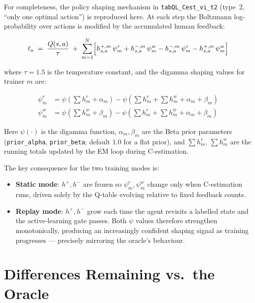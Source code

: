 \documentclass[11pt, a4paper]{article}
\begin{document}
For completeness, the policy shaping mechanism in \texttt{tabQL\_Cest\_vi\_t2}
(type~2, ``only one optimal action'') is reproduced here.  At each step the
Boltzmann log-probability over actions is modified by the accumulated human
feedback:

\begin{equation}
  \ell_a \;=\; \frac{Q(s,a)}{\tau}
  \;+\; \sum_{m=1}^{N}
    \Bigl[
      h^{+,m}_{s,a}\,\psi^r_m
      + h^{-,m}_{s,a}\,\psi^w_m
      - h^{-,m}_{s,a}\,\psi^r_m
      - h^{+,m}_{s,a}\,\psi^w_m
    \Bigr]
\end{equation}

where $\tau = 1.5$ is the temperature constant, and the digamma shaping
values for trainer $m$ are:

\begin{align}
  \psi^r_m &= \psi\!\left(\textstyle\sum h^r_m + \alpha_m\right)
             - \psi\!\left(\textstyle\sum h^r_m + \sum h^w_m + \alpha_m + \beta_m\right)
  \\[4pt]
  \psi^w_m &= \psi\!\left(\textstyle\sum h^w_m + \beta_m\right)
             - \psi\!\left(\textstyle\sum h^r_m + \sum h^w_m + \alpha_m + \beta_m\right)
\end{align}

Here $\psi(\cdot)$ is the digamma function, $\alpha_m, \beta_m$ are the Beta
prior parameters (\texttt{prior\_alpha}, \texttt{prior\_beta}; default $1.0$
for a flat prior), and $\sum h^r_m,\,\sum h^w_m$ are the running totals
updated by the EM loop during C-estimation.

The key consequence for the two training modes is:
\begin{itemize}
  \item \textbf{Static mode}: $h^+, h^-$ are frozen so $\psi^r_m, \psi^w_m$
        change only when C-estimation runs, driven solely by the Q-table
        evolving relative to fixed feedback counts.
  \item \textbf{Replay mode}: $h^+, h^-$ grow each time the agent revisits a
        labelled state and the active-learning gate passes.  Both $\psi$ values
        therefore strengthen monotonically, producing an increasingly confident
        shaping signal as training progresses — precisely mirroring the
        oracle's behaviour.
\end{itemize}

\section{Differences Remaining vs.\ the Oracle}
\label{sec:remaining_differences}
\end{document}

